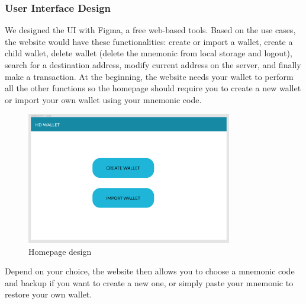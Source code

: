 \subsubsection{User Interface Design}
\bigskip

We designed the UI with Figma, a free web-based tools. Based on the use cases, the website would have these functionalities: create or import a wallet, create a child wallet, delete wallet (delete the mnemonic from local storage and logout), search for a destination address, modify current address on the server, and finally make a transaction. At the beginning, the website needs your wallet to perform all the other functions so the homepage should require you to create a new wallet or import your own wallet using your mnemonic code.

\begin{figure}[h!]
  \centering
  \includegraphics[width=0.8\textwidth]{images/component01.png}
  \caption[Homepage design]{Homepage design}
  \label{fig:homepage_desgin}
\end{figure}


Depend on your choice, the website then allows you to choose a mnemonic code and backup if you want to create a new one, or simply paste your mnemonic to restore your own wallet.

